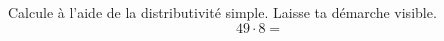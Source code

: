 %
%
    Calcule à l'aide de la distributivité simple. Laisse ta démarche visible.
    \[49 \cdot 8=\]
